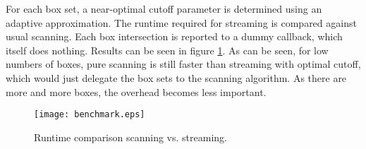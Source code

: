 For each box set, a near-optimal cutoff parameter is determined using an adaptive approximation. The runtime required for streaming is compared against usual scanning. Each box intersection is reported to a dummy callback, which itself does nothing. Results can be seen in figure \ref{fig_benchmark}. As can be seen, for low numbers of boxes, pure scanning is still faster than streaming with optimal cutoff, which would just delegate the box sets to the scanning algorithm. As there are more and more boxes, the overhead becomes less important.

\begin{ccTexOnly}
 \begin{figure}
  \begin{center}
  \texttt{[image: benchmark.eps]}
  \caption{Runtime comparison scanning vs. streaming.}
  \label{fig_benchmark}
  \end{center}
 \end{figure}
\end{ccTexOnly}



